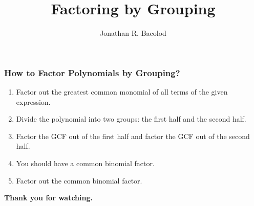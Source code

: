 \documentclass[14pt]{beamer}
\title[] {Factoring by Grouping}
\author{Jonathan R. Bacolod}
\institute[SHS]{Sauyo High School}
\date{}
\begin{document}
	\frame{\titlepage}
	
    \begin{frame}
    	\frametitle{How to Factor Polynomials by Grouping?}
    	\begin{enumerate}
    		\item<1-> Factor out the greatest common monomial of all terms of the given expression.
    		\item<2-> Divide the polynomial into two groups: the first half and the second half.
    		\item<3-> Factor the GCF out of the first half and factor the GCF out of the second half.
    		\item<4-> You should have a common binomial factor.
    		\item<5-> Factor out the common binomial factor.
    	\end{enumerate} 
    \end{frame}

    \begin{frame}
    	\begin{center}
    		\textbf{\LARGE Thank you for watching.}
    	\end{center}
    \end{frame}
	
\end{document}
